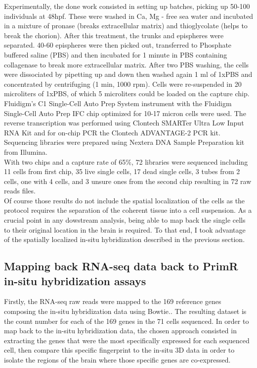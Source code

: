 	Experimentally, the done work consisted in setting up \platy{} batches, picking up 50-100 individuals at 48hpf. These were washed in Ca, Mg - free sea water and incubated in a mixture of pronase (breaks extracellular matrix) and thioglycolate (helps to break the chorion). After this treatment, the trunks and epispheres were separated. 40-60 epispheres were then picked out, transferred to Phosphate buffered saline (PBS) and then incubated for 1 minute in PBS containing collagenase to break more extracellular matrix. After two PBS washing, the cells were dissociated by pipetting up and down then washed again 1 ml of 1xPBS and concentrated by centrifuging (1 min, 1000 rpm). Cells were re-suspended in 20 microliters of 1xPBS, of which 5 microliters could be loaded on the capture chip.\\

	Fluidigm's C1 Single-Cell Auto Prep System instrument with the Fluidigm Single-Cell Auto Prep IFC chip optimized for 10-17 micron cells were used. The reverse transcription was performed using Clontech SMARTer Ultra Low Input RNA Kit and for on-chip PCR the Clontech ADVANTAGE-2 PCR kit. Sequencing libraries were prepared using Nextera DNA Sample Preparation kit from Illumina.\\

	With two chips and a capture rate of 65\%, 72 libraries were sequenced including 11 cells from first chip, 35 live single cells, 17 dead single cells, 3 tubes from 2 cells, one with 4 cells, and 3 unsure ones from the second chip resulting in 72 raw reads files.\\	
  	
	Of course those results do not include the spatial localization of the cells as the protocol requires the separation of the coherent tissue into a cell suspension. As a crucial point in any dowstream analysis, being able to map back the single cells to their original location in the brain is required. To that end, I took advantage of the spatially localized in-situ hybridization described in the previous section.\\

  \subsection{Mapping back RNA-seq data back to PrimR in-situ hybridization assays}
  	Firstly, the RNA-seq raw reads were mapped to the 169 reference genes composing the in-situ hybridization data using Bowtie.. The resulting dataset is the count number for each of the 169 genes in the 71 cells sequenced. In order to map back to the in-situ hybridization data, the chosen approach consisted in extracting the genes that were the most specifically expressed for each sequenced cell, then compare this specific fingerprint to the in-situ 3D data in order to isolate the regions of the brain where those specific genes are co-expressed.\\
	
